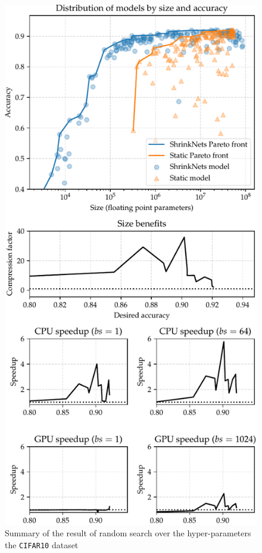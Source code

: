 \begin{figure}
\begin{center}
\includegraphics[width=\columnwidth]{CIFAR10_VGG_summary}
\vspace*{-5mm}
\caption{\label{figure_CIFAR10} Summary of the result of random
search over the hyper-parameters the \texttt{CIFAR10} dataset}
\end{center}
\vspace*{-4mm}
\end{figure}

